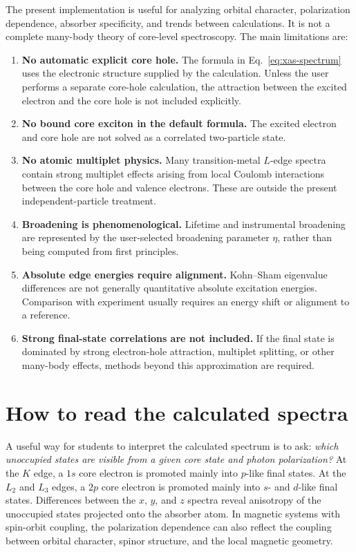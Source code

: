 \documentclass[11pt,a4paper]{article}
\begin{document}
The present implementation is useful for analyzing orbital character,
polarization dependence, absorber specificity, and trends between calculations.
It is not a complete many-body theory of core-level spectroscopy. The main
limitations are:
\begin{enumerate}
  \item \textbf{No automatic explicit core hole.}
  The formula in Eq.~\eqref{eq:xas-spectrum} uses the electronic structure
  supplied by the calculation. Unless the user performs a separate core-hole
  calculation, the attraction between the excited electron and the core hole is
  not included explicitly.

  \item \textbf{No bound core exciton in the default formula.}
  The excited electron and core hole are not solved as a correlated two-particle
  state.

  \item \textbf{No atomic multiplet physics.}
  Many transition-metal \(L\)-edge spectra contain strong multiplet effects
  arising from local Coulomb interactions between the core hole and valence
  electrons. These are outside the present independent-particle treatment.

  \item \textbf{Broadening is phenomenological.}
  Lifetime and instrumental broadening are represented by the user-selected
  broadening parameter \(\eta\), rather than being computed from first
  principles.

  \item \textbf{Absolute edge energies require alignment.}
  Kohn--Sham eigenvalue differences are not generally quantitative absolute
  excitation energies. Comparison with experiment usually requires an energy
  shift or alignment to a reference.

  \item \textbf{Strong final-state correlations are not included.}
  If the final state is dominated by strong electron-hole attraction, multiplet
  splitting, or other many-body effects, methods beyond this approximation are
  required.
\end{enumerate}

\section{How to read the calculated spectra}

A useful way for students to interpret the calculated spectrum is to ask:
\emph{which unoccupied states are visible from a given core state and photon
polarization?} At the \(K\) edge, a \(1s\) core electron is promoted mainly into
\(p\)-like final states. At the \(L_2\) and \(L_3\) edges, a \(2p\) core electron
is promoted mainly into \(s\)- and \(d\)-like final states. Differences between
the \(x\), \(y\), and \(z\) spectra reveal anisotropy of the unoccupied states
projected onto the absorber atom. In magnetic systems with spin-orbit coupling,
the polarization dependence can also reflect the coupling between orbital
character, spinor structure, and the local magnetic geometry.
\end{document}
